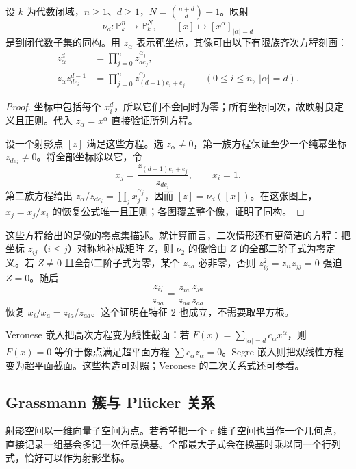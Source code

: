 \begin{proposition}
\label{g5:prop:veronese-embedding}
	设 \(k\) 为代数闭域，\(n\geq1\)、\(d\geq1\)，\(N=\binom{n+d}{d}-1\)。映射
	\[
		\nu_d:\mathbb P^n_k\longrightarrow\mathbb P^N_k,
		\qquad[x]\longmapsto[x^\alpha]_{|\alpha|=d}
	\]
	是到闭代数子集的同构。用 \(z_\alpha\) 表示靶坐标，其像可由以下有限族齐次方程刻画：
	\begin{align*}
		z_\alpha^d&=\prod_{j=0}^n z_{de_j}^{\alpha_j},\\
		z_\alpha z_{de_i}^{d-1}
		&=\prod_{j=0}^n z_{(d-1)e_i+e_j}^{\alpha_j}
		\qquad(0\leq i\leq n,\ |\alpha|=d).
	\end{align*}
\end{proposition}
\begin{proof}
	坐标中包括每个 \(x_i^d\)，所以它们不会同时为零；所有坐标同次，故映射良定义且正则。代入 \(z_\alpha=x^\alpha\) 直接验证所列方程。

	设一个射影点 \([z]\) 满足这些方程。选 \(z_\alpha\ne0\)，第一族方程保证至少一个纯幂坐标 \(z_{de_i}\ne0\)。将全部坐标除以它，令
	\[
		x_j=\frac{z_{(d-1)e_i+e_j}}{z_{de_i}},\qquad x_i=1.
	\]
	第二族方程给出 \(z_\alpha/z_{de_i}=\prod_j x_j^{\alpha_j}\)，因而 \([z]=\nu_d([x])\)。在这张图上，\(x_j=x_j/x_i\) 的恢复公式唯一且正则；各图覆盖整个像，证明了同构。
\end{proof}

这些方程给出的是像的零点集描述。就计算而言，二次情形还有更简洁的方程：把坐标 \(z_{ij}\)（\(i\leq j\)）对称地补成矩阵 \(Z\)，则 \(\nu_2\) 的像恰由 \(Z\) 的全部二阶子式为零定义。若 \(Z\ne0\) 且全部二阶子式为零，某个 \(z_{aa}\) 必非零，否则 \(z_{ij}^2=z_{ii}z_{jj}=0\) 强迫 \(Z=0\)。随后
\[
	\frac{z_{ij}}{z_{aa}}
	=\frac{z_{ia}}{z_{aa}}\frac{z_{ja}}{z_{aa}}
\]
恢复 \(x_i/x_a=z_{ia}/z_{aa}\)。这个证明在特征 \(2\) 也成立，不需要取平方根。

Veronese 嵌入把高次方程变为线性截面：若 \(F(x)=\sum_{|\alpha|=d}c_\alpha x^\alpha\)，则 \(F(x)=0\) 等价于像点满足超平面方程 \(\sum c_\alpha z_\alpha=0\)。Segre 嵌入则把双线性方程变为超平面截面。这些构造可对照\cite[第I章，第2节，习题2.12--2.15]{Hartshorne1977}；Veronese 的二次关系式还可参看\cite[第1章，第4节，例1.28]{Shafarevich2013Basic1}。

\subsection{Grassmann 簇与 Plücker 关系}
\label{g5:subsec:0103:03}

射影空间以一维向量子空间为点。若希望把一个 \(r\) 维子空间也当作一个几何点，直接记录一组基会多记一次任意换基。全部最大子式会在换基时乘以同一个行列式，恰好可以作为射影坐标。

